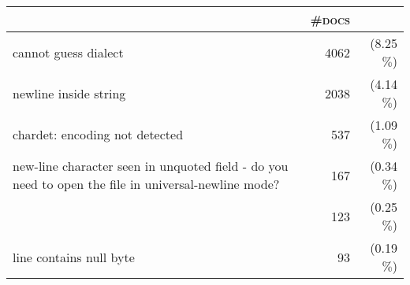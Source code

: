 \begin{tabular}{lrr} 
 \toprule 
 & \textsc{\#docs} & \\ 
 \midrule 
cannot guess dialect&4062 &(8.25$\%$)\\ 
  newline inside string&2038 &(4.14$\%$)\\ 
  chardet: encoding not detected&537 &(1.09$\%$)\\ 
  new-line character seen in unquoted field - do you need to open the file in universal-newline mode?&167 &(0.34$\%$)\\ 
  &123 &(0.25$\%$)\\ 
  line contains null byte&93 &(0.19$\%$)\\ 
  \bottomrule 
 \end{tabular}